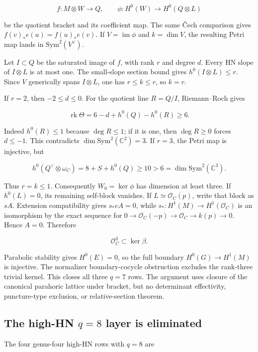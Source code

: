 \documentclass[11pt]{article}
\theoremstyle{definition}
\begin{document}
\[f:M\otimes W\longrightarrow Q,
\qquad
\phi:H^0(W)\longrightarrow H^0(Q\otimes L)\]

be the quotient bracket and its coefficient map. The same \v{C}ech
comparison gives \(f(v)_*e(u)=f(u)_*e(v)\). If
\(V=\operatorname{im}\phi\) and \(k=\dim V\), the resulting Petri map
lands in \(\mathrm{Sym}^2(V^\vee)\).

Let \(I\subset Q\) be the saturated image of \(f\), with rank \(r\) and
degree \(d\). Every HN slope of \(I\otimes L\) is at most one. The
small-slope section bound gives \(h^0(I\otimes L)\le r\). Since \(V\)
generically spans \(I\otimes L\), one has \(r\le k\le r\), so \(k=r\).

If \(r=2\), then \(-2\le d\le0\). For the quotient line \(R=Q/I\),
Riemann--Roch gives

\[\operatorname{rk}\Theta
=6-d+h^0(Q)-h^0(R)\ge6.\]

Indeed \(h^0(R)\le1\) because \(\deg R\le1\); if it is one, then
\(\deg R\ge0\) forces \(d\le-1\). This contradicts
\(\dim\mathrm{Sym}^2(\mathbb C^2)=3\). If \(r=3\), the Petri map is
injective, but

\[h^0(Q^\vee\otimes\omega_C)=8+S+h^0(Q)\ge10
>6=\dim\mathrm{Sym}^2(\mathbb C^3).\]

Thus \(r=k\le1\). Consequently \(W_0=\ker\phi\) has dimension at least
three. If \(h^0(L)=0\), its remaining self-block vanishes. If
\(L\simeq\mathcal O_C(p)\), write that block as \(sA\). Extension
compatibility gives \(s_*eA=0\), while
\(s_*:H^1(M)\to H^1(\mathcal O_C)\) is an isomorphism by the exact
sequence for \(0\to\mathcal O_C(-p)\to\mathcal O_C\to k(p)\to0\). Hence
\(A=0\). Therefore

\[\mathcal O_C^3\subset\ker\beta.\]

Parabolic stability gives \(H^0(E)=0\), so the full boundary
\(H^0(G)\to H^1(M)\) is injective. The normalizer boundary-cocycle
obstruction excludes the rank-three trivial kernel. This closes all
three \(q=7\) rows. The argument uses closure of the canonical parahoric
lattice under bracket, but no determinant effectivity, puncture-type
exclusion, or relative-section theorem.

\subsection{\texorpdfstring{The high-HN \(q=8\) layer is
eliminated}{The high-HN q=8 layer is eliminated}}\label{the-high-hn-q8-layer-is-eliminated}

The four genus-four high-HN rows with \(q=8\) are
\end{document}
